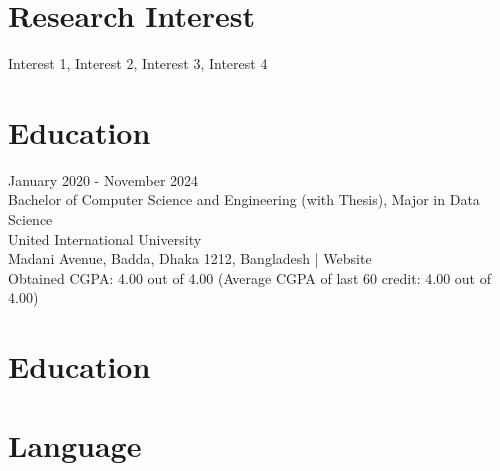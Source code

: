 \documentclass{academic-cv}
\begin{document}



\section{Research Interest}
Interest 1, Interest 2, Interest 3, Interest 4

\vspace{1.5em}
\section{Education}
January 2020 - November 2024\\
Bachelor of Computer Science and Engineering (with Thesis), Major in Data Science\\
United International University\\
Madani Avenue, Badda, Dhaka 1212, Bangladesh  |  Website\\
Obtained CGPA: 4.00 out of 4.00 (Average CGPA of last 60 credit: 4.00 out of 4.00)



\vspace{1.5em}
\section{Education}


\vspace{1.5em}
\section{Language}
\noindent{}%
\end{document}
